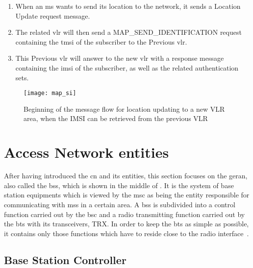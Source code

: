         \begin{enumerate}[topsep=-1em,parsep=0em,itemsep=0em]

          \item When an \gls{ms} wants to send its location to the
            network, it sends a Location Update request message.         

          \item The related \gls{vlr} will then send a
            MAP\_SEND\_IDENTIFICATION request containing the \gls{tmsi}
            of the subscriber to the Previous \gls{vlr}.

          \item This Previous \gls{vlr} will answer to the new \gls{vlr}
            with a response message containing the \gls{imsi} of the
            subscriber, as well as the related authentication sets.

        \end{enumerate}

        \begin{figure}[h]
          \centering
          \texttt{[image: map\_si]}
          \caption{Beginning of the message flow for location updating
          to a new VLR area, when the IMSI can be retrieved from the
          previous VLR~\cite[p.~479]{3gpp_ts_2015-2}}
          \label{fig:map_si}
        \end{figure}
      
  \section{Access Network entities}

    After having introduced the \gls{cn} and its entities, this section
    focuses on the \gls{geran}, also called the \gls{bss}, which is
    shown in the middle of . It is the
    system of base station equipments which is viewed by the \gls{msc}
    as being the entity responsible for communicating with \glspl{ms} in
    a certain area. A \gls{bss} is subdivided into a control function
    carried out by the \gls{bsc} and a radio transmitting function
    carried out by the \gls{bts} with its transceivers, TRX. In order to
    keep the \gls{bts} as simple as possible, it contains only those
    functions which have to reside close to the radio
    interface~\cite{etsi_gsm_2001,3gpp_ts_2002,3gpp_ts_2015}.

    \subsection{Base Station Controller}

